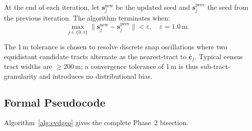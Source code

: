 \begin{definition}
\label{def:eps-convergence}
At the end of each iteration, let $\mathbf{s}_j^{\mathrm{new}}$ be the updated
seed and $\mathbf{s}_j^{\mathrm{prev}}$ the seed from the previous iteration.
The algorithm terminates when:
\[
  \max_{j \in \{0,1\}} \|\mathbf{s}_j^{\mathrm{new}} - \mathbf{s}_j^{\mathrm{prev}}\| < \varepsilon,
  \quad \varepsilon = 1.0\,\mathrm{m}.
\]
\end{definition}

The 1\,m tolerance is chosen to resolve discrete snap oscillations where two
equidistant candidate tracts alternate as the nearest-tract to
$\bar{\mathbf{c}}_j$.
Typical census tract widths are $\ge 200$\,m; a convergence tolerance of
1\,m is thus sub-tract-granularity and introduces no distributional bias.

\subsection{Formal Pseudocode}

Algorithm~\ref{alg:cvdgeo} gives the complete Phase~2 \cvdgeo{} bisection.

